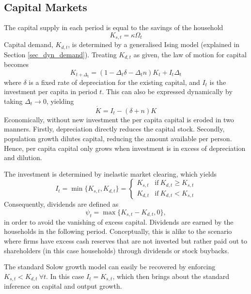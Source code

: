 \documentclass[11pt]{article}
\begin{document}
\subsection{Capital Markets}\label{sec_cap_mkt}
The capital supply in each period is equal to the savings of the household 
\begin{equation}\label{eq_cap_supply}
K_{s,t} = \kappa\Omega_t
\end{equation}
Capital demand, $K_{d,t}$, is determined by a generalised Ising model (explained in Section \ref{sec_dyn_demand}). Treating $K_{d,t}$ as given, the law of motion for capital becomes
\begin{equation}\label{eq_cap_motion}
K_{t+\Delta_t} = (1-\Delta_t\delta-\Delta_tn)K_t + I_t\Delta_t
\end{equation}
where $\delta$ is a fixed rate of depreciation for the existing capital, and $I_t$ is the investment per capita in period $t$. This can also be expressed dynamically by taking $\Delta_t\rightarrow0$, yielding
\begin{equation}\label{eq_cap_motion_d}
\dot{K} = I_t - (\delta+n)K
\end{equation}
Economically, without new investment the per capita capital is eroded in two manners. Firstly, depreciation directly reduces the capital stock. Secondly, population growth dilutes capital, reducing the amount available per person. Hence, per capita capital only grows when investment is in excess of depreciation and dilution.

The investment is determined by inelastic market clearing, which yields
\begin{equation}\label{eq_mkt_clearing}
I_{t} = \min\{K_{s,t},K_{d,t}\} = 
\begin{cases}
K_{s,t} & \textrm{if}~K_{d,t}\geq K_{s,t} \\
K_{d,t} & \textrm{if}~K_{d,t}<K_{s,t}
\end{cases}
\end{equation}
Consequently, dividends are defined as
\begin{equation}\label{eq_dividend}
\psi_t = \max\{K_{s,t}-K_{d,t},0\},
\end{equation} 
in order to avoid the vanishing of excess capital. Dividends are earned by the households in the following period. Conceptually, this is alike to the scenario where firms have excess cash reserves that are not invested but rather paid out to shareholders (in this case households) through dividends or stock buybacks.

The standard Solow growth model can easily be recovered by enforcing $K_{s,t}<K_{d,t}~\forall t$. In this case $I_t = K_{s,t}$, which then brings about the standard inference on capital and output growth.
\end{document}

